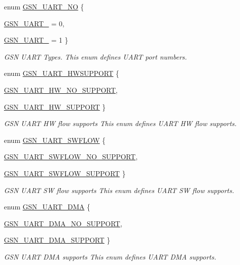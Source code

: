 \begin{DoxyCompactItemize}
enum \hyperlink{a00656_gad707454e495f43928eae3af5419aebba}{GSN\_\-UART\_\-NO} \{ \par
\hyperlink{a00656_ggad707454e495f43928eae3af5419aebbaa92016241e6e4ec1743da2d8607515588}{GSN\_\-UART\_} =  0, 
\par
\hyperlink{a00656_ggad707454e495f43928eae3af5419aebbaa7b06af4453a01dbf3d543dae032c8b08}{GSN\_\-UART\_} =  1
 \}
\begin{DoxyCompactList}\small\item\em GSN UART Types. This enum defines UART port numbers. \end{DoxyCompactList}\item 
enum \hyperlink{a00656_ga533c64d91240c65815984fe1f73817b2}{GSN\_\-UART\_\-HWSUPPORT} \{ \par
\hyperlink{a00656_gga533c64d91240c65815984fe1f73817b2a8c7dc93e66c23c714a1a4252266a33ba}{GSN\_\-UART\_\-HW\_\-NO\_\-SUPPORT}, 
\par
\hyperlink{a00656_gga533c64d91240c65815984fe1f73817b2a82cf56f78194edff113af7386e83b642}{GSN\_\-UART\_\-HW\_\-SUPPORT}
 \}
\begin{DoxyCompactList}\small\item\em GSN UART HW flow supports This enum defines UART HW flow supports. \end{DoxyCompactList}\item 
enum \hyperlink{a00656_ga7905ed9a5914128d4dd4e1f0ff7a8a56}{GSN\_\-UART\_\-SWFLOW} \{ \par
\hyperlink{a00656_gga7905ed9a5914128d4dd4e1f0ff7a8a56ae730ad90159b4ce3273e733202e78a65}{GSN\_\-UART\_\-SWFLOW\_\-NO\_\-SUPPORT}, 
\par
\hyperlink{a00656_gga7905ed9a5914128d4dd4e1f0ff7a8a56a48ad312611c254a0e7236e5f3584a26a}{GSN\_\-UART\_\-SWFLOW\_\-SUPPORT}
 \}
\begin{DoxyCompactList}\small\item\em GSN UART SW flow supports This enum defines UART SW flow supports. \end{DoxyCompactList}\item 
enum \hyperlink{a00656_ga48e5ede8ddc3ed1b7967288df611c09d}{GSN\_\-UART\_\-DMA} \{ \par
\hyperlink{a00656_gga48e5ede8ddc3ed1b7967288df611c09da61e84f0813edd6dddf49f60631c4e98f}{GSN\_\-UART\_\-DMA\_\-NO\_\-SUPPORT}, 
\par
\hyperlink{a00656_gga48e5ede8ddc3ed1b7967288df611c09da04012c54ff5d366f0f59b2807e15275c}{GSN\_\-UART\_\-DMA\_\-SUPPORT}
 \}
\begin{DoxyCompactList}\small\item\em GSN UART DMA supports This enum defines UART DMA supports. \end{DoxyCompactList}\item 

\end{DoxyCompactItemize}
